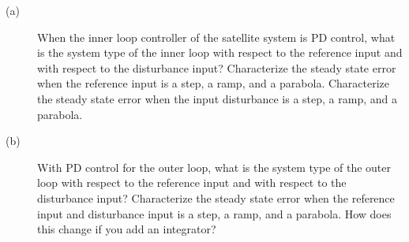 

\begin{description} \item[]
\item[(a)] When the inner loop controller of the satellite system is PD control, what is the system type of the inner loop with respect to the reference input and with respect to the disturbance input?  Characterize the steady state error when the reference input is a step, a ramp, and a parabola.  Characterize the steady state error when the input disturbance is a step, a ramp, and a parabola.
\item[(b)] With PD control for the outer loop, what is the system type of the outer loop with respect to the reference input and with respect to the disturbance input?  Characterize the steady state error when the reference input and disturbance input is a step, a ramp, and a parabola.  How does this change if you add an integrator?
\end{description}